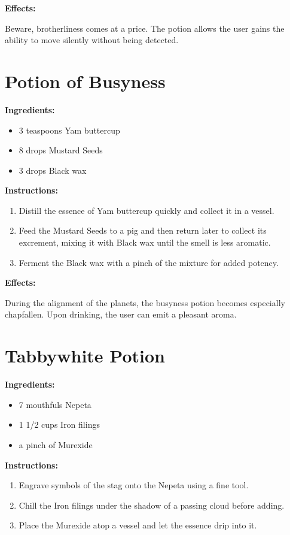 \documentclass{article}
\begin{document}
\textbf{Effects:}

Beware, brotherliness comes at a price. The potion allows the user gains the ability to move silently without being detected.

\newpage
\section*{Potion of Busyness}

\textbf{Ingredients:}

\begin{itemize}
  \item 3 teaspoons Yam buttercup
  \item 8 drops Mustard Seeds
  \item 3 drops Black wax
\end{itemize}

\textbf{Instructions:}

\begin{enumerate}
  \item Distill the essence of Yam buttercup quickly and collect it in a vessel.
  \item Feed the Mustard Seeds to a pig and then return later to collect its excrement, mixing it with Black wax until the smell is less aromatic.
  \item Ferment the Black wax with a pinch of the mixture for added potency.
\end{enumerate}

\textbf{Effects:}

During the alignment of the planets, the busyness potion becomes especially chapfallen. Upon drinking, the user can emit a pleasant aroma.

\newpage
\section*{Tabbywhite Potion}

\textbf{Ingredients:}

\begin{itemize}
  \item 7 mouthfuls Nepeta
  \item 1 1/2 cups Iron filings
  \item a pinch of Murexide
\end{itemize}

\textbf{Instructions:}

\begin{enumerate}
  \item Engrave symbols of the stag onto the Nepeta using a fine tool.
  \item Chill the Iron filings under the shadow of a passing cloud before adding.
  \item Place the Murexide atop a vessel and let the essence drip into it.
\end{enumerate}
\end{document}

